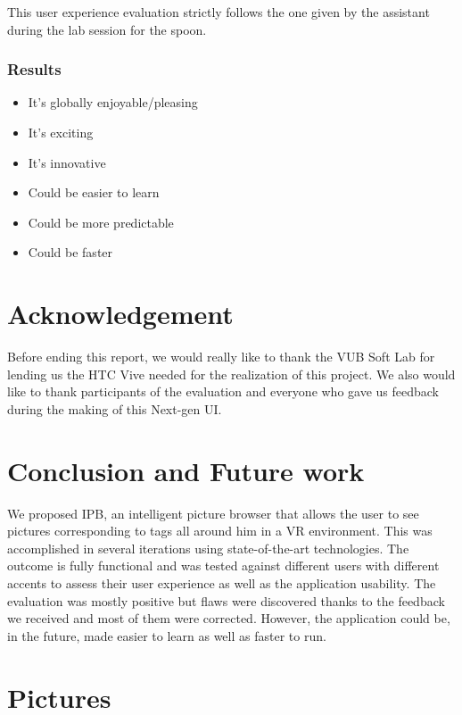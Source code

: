 \documentclass[11pt,a4paper]{article}
\begin{document}
This user experience evaluation strictly follows the one given by the assistant during the lab session for the spoon.

\subsubsection{Results}


\begin{itemize}
	\item It’s globally enjoyable/pleasing
	\item It’s exciting
	\item It’s innovative 
	\item Could be easier to learn 
	\item Could be more predictable
	\item Could be faster
\end{itemize}


\section{Acknowledgement}

Before ending this report, we would really like to thank the VUB Soft Lab for lending us the HTC Vive needed for the realization of this project.
We also would like to thank participants of the evaluation and everyone who gave us feedback during the making of this Next-gen UI.

\section{Conclusion and Future work}
We proposed IPB, an intelligent picture browser that allows the user to see pictures corresponding to tags all around him in a VR environment. This was accomplished in several iterations using state-of-the-art technologies. The outcome is fully functional and was tested against different users with different accents to assess their user experience as well as the application usability. The evaluation was mostly positive but flaws were discovered thanks to the feedback we received and most of them were corrected. However, the application could be, in the future, made easier to learn as well as faster to run.
\pagebreak
\section{Pictures}
\end{document}
